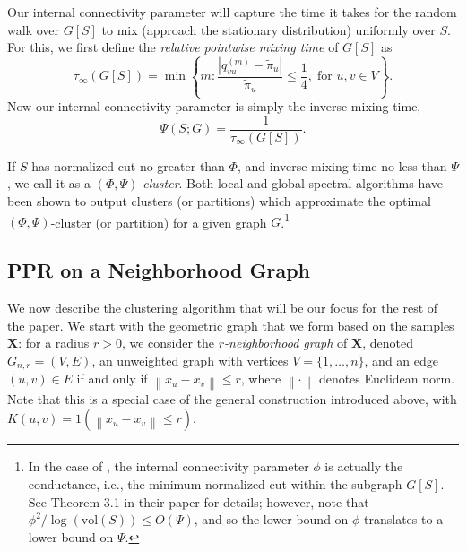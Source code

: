 \documentclass{article}
\newcommand{\set}[1]{\left\{#1\right\}}
\newcommand{\vol}{\mathrm{vol}}
\newcommand{\norm}[1]{\left\lVert#1\right\rVert}
\newcommand{\1}{\mathbf{1}}
\newcommand{\qbf}{\mathbf{q}}
\newcommand{\Xbf}{\mathbf{X}}
\theoremstyle{aldenthm}
\theoremstyle{aldenrmrk}
\begin{document}
Our internal connectivity parameter will capture the time it takes for the
random walk over $G[S]$ to mix (approach the stationary distribution)
uniformly over $S$.  For this, we first define the \emph{relative pointwise mixing
  time} of $G[S]$ as 
$$
\tau_{\infty}(G[S]) = \min\set{ m: \frac{|q_{vu}^{(m)} - 
      \widetilde\pi_u|}{\widetilde\pi_u} \leq \frac{1}{4}, 
    \; \text{for $u,v \in V$}}. 
$$
Now our internal connectivity parameter is simply the inverse mixing time, 
\begin{equation}
\label{eqn: inv_mixing_time}
\Psi(S; G) = \frac{1}{\tau_{\infty}(G[S])}.
\end{equation}

If $S$ has normalized cut no greater than $\Phi$, and inverse mixing time no
less than $\Psi$, we call it as a \emph{$(\Phi,\Psi)$-cluster}. Both
local \citep{zhu2013} and global \citep{kannan04} spectral algorithms have been
shown to output clusters (or partitions) which approximate the optimal $(\Phi,
\Psi)$-cluster (or partition) for a given graph $G$.\footnote{In the case of
  \citep{kannan04}, the internal connectivity parameter $\phi$ is actually the
  conductance, i.e., the minimum normalized cut within the subgraph $G[S]$. See
  Theorem 3.1 in their paper for details; however, note that $\phi^2 /
  \log(\vol(S)) \leq O(\Psi)$, and so the lower bound on $\phi$ translates to a
  lower bound on $\Psi$.}   

\subsection{PPR on a Neighborhood Graph}

We now describe the clustering algorithm that will be our focus for the rest of 
the paper. We start with the geometric graph that we form based on the samples 
$\Xbf$: for a radius $r > 0$, we consider the \emph{$r$-neighborhood graph} of 
$\Xbf$, denoted $G_{n,r}=(V,E)$, an unweighted graph with vertices
$V=\{1,\ldots,n\}$, and an edge $(u,v) \in E$ if and only if $\norm{x_u - x_v}
\leq  r$, where $\norm{\cdot}$ denotes Euclidean norm.  Note that this is a
special case of the general construction introduced above, with 
$K(u,v) = 1(\norm{x_u - x_v} \leq r)$. 
\end{document}

